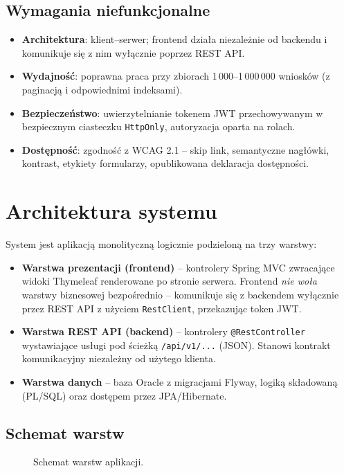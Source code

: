 \documentclass[12pt,a4paper]{article}
\begin{document}
\subsection{Wymagania niefunkcjonalne}
\begin{itemize}[leftmargin=*]
  \item \textbf{Architektura}: klient--serwer; frontend działa niezależnie od backendu
        i komunikuje się z nim wyłącznie poprzez REST API.
  \item \textbf{Wydajność}: poprawna praca przy zbiorach 1\,000--1\,000\,000 wniosków
        (z paginacją i odpowiednimi indeksami).
  \item \textbf{Bezpieczeństwo}: uwierzytelnianie tokenem JWT przechowywanym w bezpiecznym
        ciasteczku \texttt{HttpOnly}, autoryzacja oparta na rolach.
  \item \textbf{Dostępność}: zgodność z WCAG 2.1 -- skip link, semantyczne nagłówki,
        kontrast, etykiety formularzy, opublikowana deklaracja dostępności.
\end{itemize}

\section{Architektura systemu}
\label{sec:architektura}

System jest aplikacją monolityczną logicznie podzieloną na trzy warstwy:

\begin{itemize}[leftmargin=*]
  \item \textbf{Warstwa prezentacji (frontend)} -- kontrolery Spring MVC zwracające
        widoki Thymeleaf renderowane po stronie serwera. Frontend \emph{nie woła}
        warstwy biznesowej bezpośrednio -- komunikuje się z backendem wyłącznie
        przez REST API z użyciem \texttt{RestClient}, przekazując token JWT.
  \item \textbf{Warstwa REST API (backend)} -- kontrolery \texttt{@RestController}
        wystawiające usługi pod ścieżką \texttt{/api/v1/...} (JSON). Stanowi
        kontrakt komunikacyjny niezależny od użytego klienta.
  \item \textbf{Warstwa danych} -- baza Oracle z migracjami Flyway, logiką
        składowaną (PL/SQL) oraz dostępem przez JPA/Hibernate.
\end{itemize}

\subsection{Schemat warstw}
\begin{figure}[H]
  \centering
  \caption{Schemat warstw aplikacji.}
  \label{fig:warstwy}
\end{figure}
\end{document}
